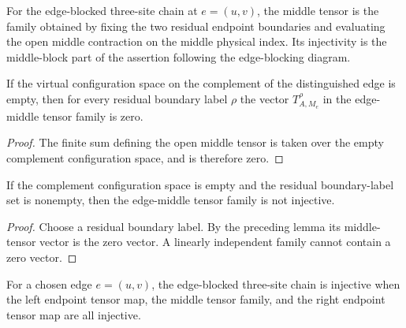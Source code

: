 \begin{definition}%
    \label{def:peps_edgeMiddleTensorFamily}
    \leanok
    For the edge-blocked three-site chain at $e=(u,v)$, the middle tensor is
    the family obtained by fixing the two residual endpoint boundaries and
    evaluating the open middle contraction on the middle physical index.
    Its injectivity is the middle-block part of the assertion following
    the edge-blocking diagram.
\end{definition}

\begin{lemma}%
    \label{lem:peps_edgeMiddleTensorFamily_eq_zero_of_isEmpty}
    \leanok
    If the virtual configuration space on the complement of the distinguished
    edge is empty, then for every residual boundary label $\rho$ the vector
    $T_{A,M_e}^{\rho}$ in the edge-middle tensor family is zero.
\end{lemma}
\begin{proof}\leanok
    The finite sum defining the open middle tensor is taken over the empty
    complement configuration space, and is therefore zero.
\end{proof}

\begin{lemma}%
    \label{lem:peps_not_edgeMiddleTensorInjective_of_isEmpty}
    \leanok
    If the complement configuration space is empty and the residual
    boundary-label set is nonempty, then the edge-middle tensor family is not
    injective.
\end{lemma}
\begin{proof}\leanok
    Choose a residual boundary label. By the preceding lemma its middle-tensor
    vector is the zero vector. A linearly independent family cannot contain a
    zero vector.
\end{proof}

\begin{definition}%
    \label{def:peps_edgeBlockedThreeSiteInjective}
    \leanok
    For a chosen edge $e=(u,v)$, the edge-blocked three-site chain is
    injective when the left endpoint tensor map, the middle tensor family, and
    the right endpoint tensor map are all injective.
\end{definition}

